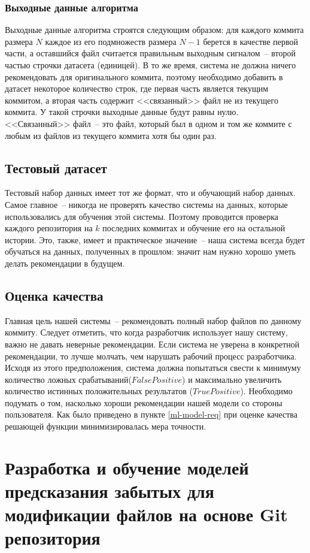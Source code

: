     \subsubsection{Выходные данные алгоритма}
 Выходные данные алгоритма строятся следующим образом: для каждого коммита размера $N$ каждое из его подмножеств размера $N - 1$ берется в качестве первой части, а оставшийся файл считается правильным выходным сигналом~-- второй частью строчки датасета (единицей). В то же время, система не должна ничего рекомендовать для оригинального коммита, поэтому необходимо добавить в датасет некоторое количество строк, где первая часть является текущим коммитом, а вторая часть содержит <<связанный>> файл не из текущего коммита. У такой строчки выходные данные будут равны нулю. <<Связанный>> файл~-- это файл, который был в одном и том же коммите с любым из файлов из текущего коммита хотя бы один раз.
    \subsection{Тестовый датасет}
Тестовый набор данных имеет тот же формат, что и обучающий набор данных. Самое главное~-- никогда не проверять качество системы на данных, которые использовались для обучения этой системы. Поэтому проводится проверка каждого репозитория на $k$ последних коммитах и обучение его на остальной истории. Это, также, имеет и практическое значение~-- наша система всегда будет обучаться на данных, полученных в прошлом: значит нам нужно хорошо уметь делать рекомендации в будущем.
    \subsection{Оценка качества}
Главная цель нашей системы~-- рекомендовать полный набор файлов по данному коммиту. Следует отметить, что когда разработчик использует нашу систему, важно не давать неверные рекомендации. Если система не уверена в конкретной рекомендации, то лучше молчать, чем нарушать рабочий процесс разработчика. Исходя из этого предположения, система должна попытаться свести к минимуму количество ложных срабатываний($FalsePositive$) и максимально увеличить количество истинных положительных результатов ($TruePositive$). Необходимо подумать о том, насколько хороши рекомендации нашей модели со стороны пользователя. Как было приведено в пункте \ref{ml-model-req} при оценке качества решающей функции минимизировалась мера точности.

\section{Разработка и обучение моделей предсказания забытых для модификации файлов на основе Git репозитория}
